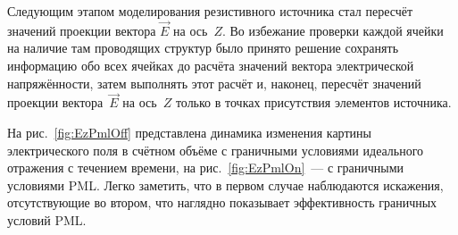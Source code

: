 Следующим этапом моделирования резистивного источника стал пересчёт
значений проекции вектора $ \vec{E} $ на ось~$ Z $. Во избежание проверки каждой ячейки на наличие там проводящих структур было принято решение сохранять информацию обо всех ячейках до расчёта значений вектора электрической напряжённости, затем выполнять этот расчёт и, наконец, пересчёт значений проекции
вектора~$ \vec{E} $ на ось~$ Z $ только в точках присутствия элементов источника.

На рис.~\ref{fig:EzPmlOff} представлена динамика изменения картины электрического поля в счётном объёме с граничными условиями идеального отражения с течением времени, на рис.~\ref{fig:EzPmlOn}~--- с граничными условиями PML. Легко заметить, что в первом случае наблюдаются искажения, отсутствующие во втором, что наглядно показывает эффективность граничных условий PML.

